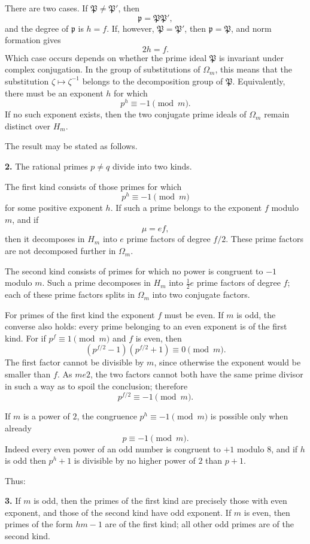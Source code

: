 \documentclass[11pt,a4paper]{book}
\newcommand{\zetaS}{\zeta}
\providecommand{\Om}{\Omega_m}
\providecommand{\Hm}{H_m}
\providecommand{\idealp}{\mathfrak p}
\begin{document}
There are two cases.  If \(\mathfrak P\ne\mathfrak P'\), then
\[
  \idealp=\mathfrak P\mathfrak P',
\]
and the degree of \(\idealp\) is \(h=f\).  If, however, \(\mathfrak P=\mathfrak P'\), then \(\idealp=\mathfrak P\), and norm formation gives
\[
  2h=f.
\]
Which case occurs depends on whether the prime ideal \(\mathfrak P\) is invariant under complex conjugation.  In the group of substitutions of \(\Om\), this means that the substitution \(\zetaS\mapsto\zetaS^{-1}\) belongs to the decomposition group of \(\mathfrak P\).  Equivalently, there must be an exponent \(h\) for which
\[
  p^h\equiv -1\pmod m.
\tag{1}
\]
If no such exponent exists, then the two conjugate prime ideals of \(\Om\) remain distinct over \(\Hm\).

The result may be stated as follows.

\textbf{2.} The rational primes \(p\ne q\) divide into two kinds.

The first kind consists of those primes for which
\[
  p^h\equiv -1\pmod m
\]
for some positive exponent \(h\).  If such a prime belongs to the exponent \(f\) modulo \(m\), and if
\[
  \mu=ef,
\]
then it decomposes in \(\Hm\) into \(e\) prime factors of degree \(f/2\).  These prime factors are not decomposed further in \(\Om\).

The second kind consists of primes for which no power is congruent to \(-1\) modulo \(m\).  Such a prime decomposes in \(\Hm\) into \(\frac12e\) prime factors of degree \(f\); each of these prime factors splits in \(\Om\) into two conjugate factors.

For primes of the first kind the exponent \(f\) must be even.  If \(m\) is odd, the converse also holds: every prime belonging to an even exponent is of the first kind.  For if \(p^f\equiv1\pmod m\) and \(f\) is even, then
\[
  (p^{f/2}-1)(p^{f/2}+1)\equiv0\pmod m.
\]
The first factor cannot be divisible by \(m\), since otherwise the exponent would be smaller than \(f\).  As \(m
e2\), the two factors cannot both have the same prime divisor in such a way as to spoil the conclusion; therefore
\[
  p^{f/2}\equiv -1\pmod m.
\]

If \(m\) is a power of \(2\), the congruence \(p^h\equiv-1\pmod m\) is possible only when already
\[
  p\equiv -1\pmod m.
\]
Indeed every even power of an odd number is congruent to \(+1\) modulo \(8\), and if \(h\) is odd then \(p^h+1\) is divisible by no higher power of \(2\) than \(p+1\).

Thus:

\textbf{3.} If \(m\) is odd, then the primes of the first kind are precisely those with even exponent, and those of the second kind have odd exponent.  If \(m\) is even, then primes of the form \(hm-1\) are of the first kind; all other odd primes are of the second kind.
\end{document}
